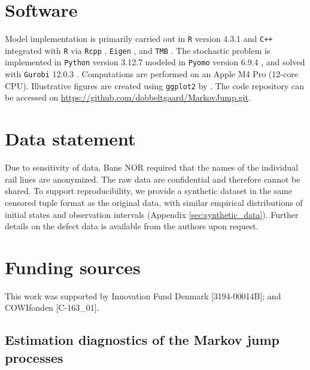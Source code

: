 \documentclass{article}
\begin{document}
\section*{Software}
Model implementation is primarily carried out in \texttt{R} version 4.3.1 \citep{R_stats} and \texttt{C++} integrated with \texttt{R} via \texttt{Rcpp} \citep{Rcpp}, \texttt{Eigen} \citep{eigenweb}, and \texttt{TMB} \citep{TMB}. 
The stochastic problem is implemented in \texttt{Python} version 3.12.7 modeled in \texttt{Pyomo} version 6.9.4 \citep{bynum2021pyomo,hart2011pyomo}, and solved with \texttt{Gurobi} 12.0.3 \citep{gurobi}.
Computations are performed on an Apple M4 Pro (12-core CPU). Illustrative figures are created using \verb|ggplot2| by \citet{ggplot2}. The code repository can be accessed on \url{https://github.com/dobbeltgaard/MarkovJump.git}.

\section*{Data statement}
Due to sensitivity of data, Bane NOR required that the names of the individual rail lines are anonymized. The raw data are confidential and therefore cannot be shared. To support reproducibility, we provide a synthetic dataset in the same censored tuple format as the original data, with similar empirical distributions of initial states and observation intervals (Appendix \ref{sec:synthetic_data}). Further details on the defect data is available from the authors upon request.


\section*{Funding sources}
This work was supported by Innovation Fund Denmark [3194-00014B]; and COWIfonden [C-163\_01].

 
\newpage
\appendix


\clearpage
\begin{landscape}

\section{Estimation diagnostics of the Markov jump processes}
\label{sec:diagnostics_estimation}

\begin{table}[h!]
\centering
\caption{Akaike information criterion (AIC; computed from the log-likelihood at the score-optimal parameters) and per-observation gradient norm of the score objective.}
\label{tab:AIC_tab}
\scriptsize

\end{table}

\end{landscape}
\clearpage
\end{document}
